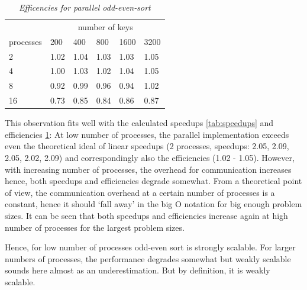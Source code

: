 \documentclass[a4paper,11pt,twoside]{article}
\begin{document}
\begin{table}[]
\centering
\caption{\textit{Efficencies for parallel odd-even-sort}}
\label{tab:efficiencies}
\begin{tabular}{llllll}
\multicolumn{1}{l|}{}          & \multicolumn{5}{c}{number of keys}                                                                                \\ \cline{2-6} 
\multicolumn{1}{l|}{processes} & \multicolumn{1}{l|}{200} & \multicolumn{1}{l|}{400} & \multicolumn{1}{l|}{800} & \multicolumn{1}{l|}{1600} & 3200 \\ \hline
2                              & 1.02                     & 1.04                     & 1.03                     & 1.03                      & 1.05 \\
4                              & 1.00                     & 1.03                     & 1.02                     & 1.04                      & 1.05 \\
8                              & 0.92                     & 0.99                     & 0.96                     & 0.94                      & 1.02 \\
16                             & 0.73                     & 0.85                     & 0.84                     & 0.86                      & 0.87
\end{tabular}
\end{table}

This observation fits well with the calculated speedups \ref{tab:speedups} and efficiencies \ref{tab:efficiencies}: At low number of processes, the parallel implementation exceeds even the theoretical ideal of linear speedups (2 processes, speedups: 2.05, 2.09, 2.05, 2.02, 2.09) and correspondingly also the efficiencies (1.02 - 1.05). However, with increasing number of processes, the overhead for communication increases hence, both speedups and efficiencies degrade somewhat. From a theoretical point of view, the communication overhead at a certain number of processes is a constant, hence it should `fall away' in the big O notation for big enough problem sizes. It can be seen that both speedups and efficiencies increase again at high number of processes for the largest problem sizes.

Hence, for low number of processes odd-even sort is strongly scalable. For larger numbers of processes, the performance degrades somewhat but weakly scalable sounds here almost as an underestimation. But by definition, it is weakly scalable. 


\appendix
\end{document}
